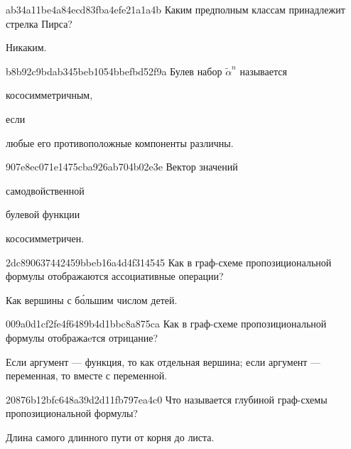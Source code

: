 \begin{note}{ab34a11be4a84ecd83fba4efe21a1a4b}
    Каким предполным классам принадлежит стрелка Пирса?

    \begin{cloze}{1}
        Никаким.
    \end{cloze}
\end{note}

\begin{note}{b8b92c9bdab345beb1054bbefbd52f9a}
    Булев набор \({ \widetilde \alpha^{n} }\) называется \begin{icloze}{2}кососимметричным,\end{icloze} если \begin{icloze}{1}любые его противоположные компоненты различны.\end{icloze}
\end{note}

\begin{note}{907e8ec071e1475cba926ab704b02e3e}
    Вектор значений \begin{icloze}{2}самодвойственной\end{icloze} булевой функции \begin{icloze}{1}кососимметричен.\end{icloze}
\end{note}

\begin{note}{2dc890637442459bbeb16a4d4f314545}
    Как в граф-схеме пропозициональной формулы отображаются ассоциативные операции?

    \begin{cloze}{1}
        Как вершины с б\'{о}льшим числом детей.
    \end{cloze}
\end{note}

\begin{note}{009a0d1cf2fe4f6489b4d1bbc8a875ca}
    Как в граф-схеме пропозициональной формулы отображаeтся отрицание?

    \begin{cloze}{1}
        Если аргумент --- функция, то как отдельная вершина; если аргумент --- переменная, то вместе с переменной.
    \end{cloze}
\end{note}

\begin{note}{20876b12bfc648a39d2d11fb797ea4c0}
   Что называется глубиной граф-схемы пропозициональной формулы?

   \begin{cloze}{1}
        Длина самого длинного пути от корня до листа.
   \end{cloze}
\end{note}

